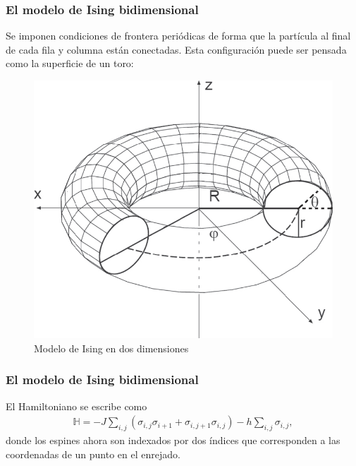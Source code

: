 \documentclass{beamer}
\begin{document}
\begin{frame}
\frametitle{El modelo de Ising bidimensional}
Se imponen condiciones de frontera periódicas de forma que la part\'icula al final de cada fila y columna están conectadas. Esta configuraci\'on puede ser pensada como la superficie de un toro: 
%
\begin{figure}
\centering
\includegraphics[scale=0.5]{fig/torus.png}
\caption{Modelo de Ising en dos dimensiones}
\end{figure}
\end{frame}

\begin{frame}
\frametitle{El modelo de Ising bidimensional}

El Hamiltoniano se escribe como 
\begin{eqnarray}
\mathbb{H}= -J \sum_{i,j} (\sigma_{i,j}\sigma_{i+1}+\sigma_{i,j+1}\sigma_{i,j}) - h \sum_{i,j}\sigma_{i,j},
\end{eqnarray}
donde los espines ahora son indexados por dos \'indices que corresponden a las coordenadas de un punto en el enrejado.

\end{frame}
\end{document}
